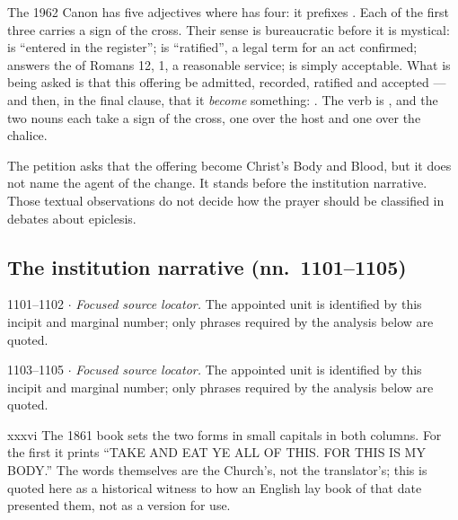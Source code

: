 The 1962 Canon has five adjectives where  has four: it
prefixes . Each of the first three carries a sign of the
cross. Their sense is bureaucratic before it is mystical: 
is ``entered in the register'';  is ``ratified'', a legal term
for an act confirmed;  answers the  of Romans 12, 1, a reasonable service;  is
simply acceptable. What is being asked is that this offering be admitted,
recorded, ratified and accepted --- and then, in the final clause, that it
\emph{become} something: . The verb is , and the two nouns each take a sign of
the cross, one over the host and one over the chalice.

The petition asks that the offering become Christ's Body and Blood, but it does
not name the agent of the change. It stands before the institution narrative.
Those textual observations do not decide how the prayer should be classified
in debates about epiclesis.

\subsection*{The institution narrative (nn.~1101--1105)}

\begin{appointed}{1101--1102 $\cdot$ }
\textit{Focused source locator.} The appointed unit is identified by this incipit and marginal number; only phrases required by the analysis below are quoted.
\end{appointed}

\begin{appointed}{1103--1105 $\cdot$ }
\textit{Focused source locator.} The appointed unit is identified by this incipit and marginal number; only phrases required by the analysis below are quoted.
\end{appointed}

\begin{englishwitness}{xxxvi}
The 1861 book sets the two forms in small capitals in both columns. For the
first it prints ``TAKE AND EAT YE ALL OF THIS. FOR THIS IS MY BODY.'' The words
themselves are the Church's, not the translator's; this is quoted here as a
historical witness to how an English lay book of that date presented them, not
as a version for use.
\end{englishwitness}

